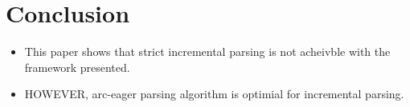 \documentclass[a4paper]{article}
\begin{document}
\section{Conclusion}
\begin{itemize}
    \item This paper shows that strict incremental parsing is not acheivble with the framework presented.
    \item HOWEVER, arc-eager parsing algorithm is optimial for incremental parsing.
\end{itemize}
\end{document}

